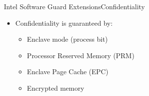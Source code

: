 \documentclass{beamer}
\begin{document}
\begin{frame}{Intel Software Guard Extensions}{Confidentiality}
    \begin{itemize}
    	\item Confidentiality is guaranteed by:

			\vfill

    	\begin{itemize}
    		\item Enclave mode (process bit)

  			\vfill

    		\item Processor Reserved Memory (PRM)

  			\vfill

    		\item Enclave Page Cache (EPC)

  			\vfill

    		\item Encrypted memory
    	\end{itemize}
    \end{itemize}
\end{frame}


\end{document}
